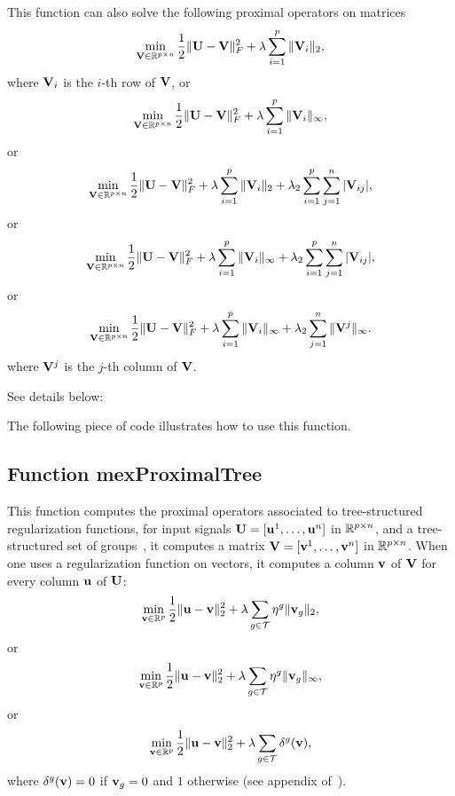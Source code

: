 \documentclass[a4paper, 11pt]{article}
\begin{document}
This function can also solve the following proximal operators on matrices
\begin{equation}
\min_{{\mathbf V} \in {\mathbb R}^{p \times n}} \frac{1}{2}\|{\mathbf U}-{\mathbf V}\|_F^2 + \lambda \sum_{i=1}^p \|{\mathbf V}_i\|_2,
\end{equation}
where ${\mathbf V}_i$ is the $i$-th row of ${\mathbf V}$, or
\begin{equation}
\min_{{\mathbf V} \in {\mathbb R}^{p \times n}} \frac{1}{2}\|{\mathbf U}-{\mathbf V}\|_F^2 + \lambda \sum_{i=1}^p \|{\mathbf V}_i\|_\infty,
\end{equation}
or
\begin{equation}
\min_{{\mathbf V} \in {\mathbb R}^{p \times n}} \frac{1}{2}\|{\mathbf U}-{\mathbf V}\|_F^2 + \lambda \sum_{i=1}^p \|{\mathbf V}_i\|_2 +\lambda_2 \sum_{i=1}^p\sum_{j=1}^n |{\mathbf V}_{ij}|,
\end{equation}
or
\begin{equation}
\min_{{\mathbf V} \in {\mathbb R}^{p \times n}} \frac{1}{2}\|{\mathbf U}-{\mathbf V}\|_F^2 + \lambda \sum_{i=1}^p \|{\mathbf V}_i\|_\infty +\lambda_2 \sum_{i=1}^p\sum_{j=1}^n |{\mathbf V}_{ij}|,
\end{equation}
or
\begin{equation}
\min_{{\mathbf V} \in {\mathbb R}^{p \times n}} \frac{1}{2}\|{\mathbf U}-{\mathbf V}\|_F^2 + \lambda \sum_{i=1}^p \|{\mathbf V}_i\|_\infty +\lambda_2 \sum_{j=1}^n \|{\mathbf V}^j\|_\infty.
\end{equation}
where ${\mathbf V}^j$ is the $j$-th column of ${\mathbf V}$.

See details below:

The following piece of code illustrates how to use this function.


\subsection{Function mexProximalTree}
This function computes the proximal operators associated to tree-structured regularization functions, for input signals ${\mathbf U}=[{\mathbf u}^1,\ldots,{\mathbf u}^n]$ in ${\mathbb R}^{p \times n}$, and a tree-structured set of groups~\cite{jenatton3}, it computes a matrix ${\mathbf V}=[{\mathbf v}^1,\ldots,{\mathbf v}^n]$ in ${\mathbb R}^{p \times n}$. When one uses a regularization function on vectors, it computes a column ${\mathbf v}$ of ${\mathbf V}$ for every column ${\mathbf u}$ of ${\mathbf U}$:
\begin{equation}
\min_{{\mathbf v} \in {\mathbb R}^p} \frac{1}{2}\|{\mathbf u}-{\mathbf v}\|_2^2 + \lambda \sum_{g \in {\mathcal T}} \eta^g \|{\mathbf v}_g\|_2,
   \end{equation}
   or
   \begin{equation}
   \min_{{\mathbf v} \in {\mathbb R}^p} \frac{1}{2}\|{\mathbf u}-{\mathbf v}\|_2^2 + \lambda \sum_{g \in {\mathcal T}} \eta^g \|{\mathbf v}_g\|_\infty,
   \end{equation}
   or
   \begin{equation}
   \min_{{\mathbf v} \in {\mathbb R}^p} \frac{1}{2}\|{\mathbf u}-{\mathbf v}\|_2^2 + \lambda \sum_{g \in {\mathcal T}} \delta^g({\mathbf v}),
   \end{equation}
   where $\delta^g({\mathbf v})=0$ if ${\mathbf v}_g=0$ and $1$ otherwise (see appendix of~\cite{jenatton4}).
\end{document}
